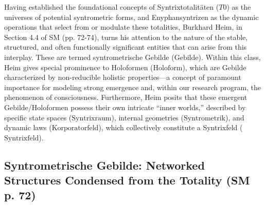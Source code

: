 \documentclass[
    12pt,              %
    a4paper,           %
    headings=normal,   %
    twoside=true,      %
    BCOR=8mm,          %
]{scrbook}
\newcommand{\q}[1]{\enquote{#1}}
\newcommand{\syntrixtotalitaet}{T0}
\newcommand{\syntrixfeld}{\text{Syntrixfeld}}
\newcommand{\syntrometrischesGebilde}{\text{Gebilde}}
\newcommand{\holoform}{\text{Holoform}}
\newcommand{\syntrixraum}{\text{Syntrixraum}}
\newcommand{\syntrometrik}{\text{Syntrometrik}}
\newcommand{\korporatorfeld}{\text{Korporatorfeld}}
\begin{document}
Having established the foundational concepts of Syntrixtotalitäten (\(\syntrixtotalitaet\)) as the universes of potential syntrometric forms, and Enyphansyntrizen as the dynamic operations that select from or modulate these totalities, Burkhard Heim, in Section 4.4 of SM (pp. 72-74), turns his attention to the nature of the stable, structured, and often functionally significant entities that can arise from this interplay. These are termed syntrometrische Gebilde (\(\syntrometrischesGebilde\)). Within this class, Heim gives special prominence to Holoformen (\(\holoform\)), which are Gebilde characterized by non-reducible holistic properties—a concept of paramount importance for modeling strong emergence and, within our research program, the phenomenon of consciousness. Furthermore, Heim posits that these emergent Gebilde/Holoformen possess their own intricate \q{inner worlds,} described by specific state spaces (\(\syntrixraum\)), internal geometries (\(\syntrometrik\)), and dynamic laws (\(\korporatorfeld\)), which collectively constitute a Syntrixfeld (\(\syntrixfeld\)).

\subsection{Syntrometrische Gebilde: Networked Structures Condensed from the Totality (SM p. 72)}
\label{sec:ch4_gebilde_definition_revised_2} 
\end{document}
